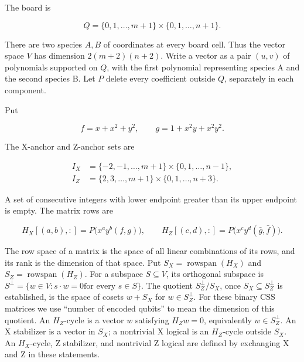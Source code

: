 \documentclass{article}
\begin{document}
The board is

\begin{equation}
 Q=\{0,1,\ldots,m+1\}\times\{0,1,\ldots,n+1\}.
\end{equation}

There are two species \(A,B\) of coordinates at every board cell. Thus
the vector space \(V\) has dimension \(2(m+2)(n+2)\). Write a vector as
a pair \((u,v)\) of polynomials supported on \(Q\), with the first
polynomial representing species A and the second species B. Let \(P\)
delete every coefficient outside \(Q\), separately in each component.

Put

\begin{equation}
 f=x+x^2+y^2,\qquad g=1+x^2y+x^2y^2.
\end{equation}

The X-anchor and Z-anchor sets are

\begin{equation}
\begin{aligned}
 I_X&=\{-2,-1,\ldots,m+1\}\times\{0,1,\ldots,n-1\},\\
 I_Z&=\{2,3,\ldots,m+1\}\times\{0,1,\ldots,n+3\}.
\end{aligned}
\end{equation}

A set of consecutive integers with lower endpoint greater than its upper
endpoint is empty. The matrix rows are

\begin{equation}
 H_X[(a,b),:]=P\bigl(x^ay^b(f,g)\bigr),\qquad
 H_Z[(c,d),:]=P\bigl(x^cy^d(\bar g,\bar f)\bigr).
\end{equation}

The row space of a matrix is the space of all linear combinations of its
rows, and its rank is the dimension of that space. Put
\(S_X=\operatorname{rowspan}(H_X)\) and
\(S_Z=\operatorname{rowspan}(H_Z)\). For a subspace \(S\subseteq V\),
its orthogonal subspace is
\(S^\perp=\{w\in V : s\cdot w=0 \text{for every } s\in S\}\). The
quotient \(S_Z^\perp/S_X\), once \(S_X\subseteq S_Z^\perp\) is
established, is the space of cosets \(w+S_X\) for \(w\in S_Z^\perp\).
For these binary CSS matrices we use ``number of encoded qubits'' to
mean the dimension of this quotient. An \(H_Z\)-cycle is a vector
\(w\) satisfying \(H_Zw=0\), equivalently \(w\in S_Z^\perp\).
An X stabilizer is a vector in \(S_X\); a nontrivial X logical is an
\(H_Z\)-cycle outside \(S_X\). An \(H_X\)-cycle, Z stabilizer, and
nontrivial Z logical are defined by exchanging X and Z in these statements.
\end{document}
